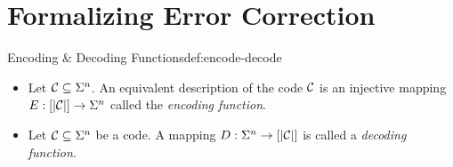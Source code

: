 \section{Formalizing Error Correction}
\begin{definition}{Encoding \& Decoding Functions}{def:encode-decode}
	\begin{itemize}
\item 	Let $\mathcal{C}\subseteq \Sigma^n$. An equivalent description of the code $\mathcal{C}$ is an injective mapping $E : [|\mathcal{C}|]\to \Sigma^n$ called the \textit{encoding function}.
\item Let $\mathcal{C}\subseteq \Sigma^n$ be a code. A mapping $D:\Sigma^n\to[|\mathcal{C}|]$ is called a \textit{decoding function}.
	\end{itemize}
\end{definition}










